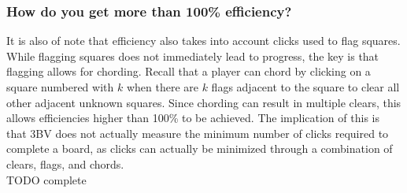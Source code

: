 \subsubsection*{How do you get more than 100\% efficiency?}

It is also of note that efficiency also takes into account clicks used to flag squares. While flagging squares does not immediately lead to progress, the key is that flagging allows for chording. Recall that a player can chord by clicking on a square numbered with $k$ when there are $k$ flags adjacent to the square to clear all other adjacent unknown squares. Since chording can result in multiple clears, this allows efficiencies higher than 100\% to be achieved. The implication of this is that 3BV does not actually measure the minimum number of clicks required to complete a board, as clicks can actually be minimized through a combination of clears, flags, and chords.\\

TODO complete